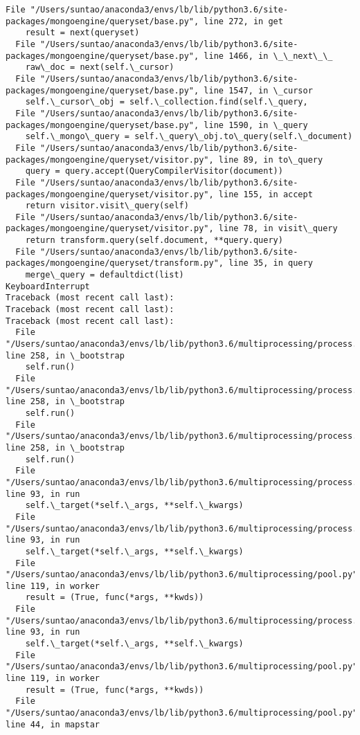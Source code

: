\documentclass[11pt]{article}
\begin{document}
\begin{Verbatim}[commandchars=\\\{\}]
  File "/Users/suntao/anaconda3/envs/lb/lib/python3.6/site-packages/mongoengine/queryset/base.py", line 272, in get
    result = next(queryset)
  File "/Users/suntao/anaconda3/envs/lb/lib/python3.6/site-packages/mongoengine/queryset/base.py", line 1466, in \_\_next\_\_
    raw\_doc = next(self.\_cursor)
  File "/Users/suntao/anaconda3/envs/lb/lib/python3.6/site-packages/mongoengine/queryset/base.py", line 1547, in \_cursor
    self.\_cursor\_obj = self.\_collection.find(self.\_query,
  File "/Users/suntao/anaconda3/envs/lb/lib/python3.6/site-packages/mongoengine/queryset/base.py", line 1590, in \_query
    self.\_mongo\_query = self.\_query\_obj.to\_query(self.\_document)
  File "/Users/suntao/anaconda3/envs/lb/lib/python3.6/site-packages/mongoengine/queryset/visitor.py", line 89, in to\_query
    query = query.accept(QueryCompilerVisitor(document))
  File "/Users/suntao/anaconda3/envs/lb/lib/python3.6/site-packages/mongoengine/queryset/visitor.py", line 155, in accept
    return visitor.visit\_query(self)
  File "/Users/suntao/anaconda3/envs/lb/lib/python3.6/site-packages/mongoengine/queryset/visitor.py", line 78, in visit\_query
    return transform.query(self.document, **query.query)
  File "/Users/suntao/anaconda3/envs/lb/lib/python3.6/site-packages/mongoengine/queryset/transform.py", line 35, in query
    merge\_query = defaultdict(list)
KeyboardInterrupt
Traceback (most recent call last):
Traceback (most recent call last):
Traceback (most recent call last):
  File "/Users/suntao/anaconda3/envs/lb/lib/python3.6/multiprocessing/process.py", line 258, in \_bootstrap
    self.run()
  File "/Users/suntao/anaconda3/envs/lb/lib/python3.6/multiprocessing/process.py", line 258, in \_bootstrap
    self.run()
  File "/Users/suntao/anaconda3/envs/lb/lib/python3.6/multiprocessing/process.py", line 258, in \_bootstrap
    self.run()
  File "/Users/suntao/anaconda3/envs/lb/lib/python3.6/multiprocessing/process.py", line 93, in run
    self.\_target(*self.\_args, **self.\_kwargs)
  File "/Users/suntao/anaconda3/envs/lb/lib/python3.6/multiprocessing/process.py", line 93, in run
    self.\_target(*self.\_args, **self.\_kwargs)
  File "/Users/suntao/anaconda3/envs/lb/lib/python3.6/multiprocessing/pool.py", line 119, in worker
    result = (True, func(*args, **kwds))
  File "/Users/suntao/anaconda3/envs/lb/lib/python3.6/multiprocessing/process.py", line 93, in run
    self.\_target(*self.\_args, **self.\_kwargs)
  File "/Users/suntao/anaconda3/envs/lb/lib/python3.6/multiprocessing/pool.py", line 119, in worker
    result = (True, func(*args, **kwds))
  File "/Users/suntao/anaconda3/envs/lb/lib/python3.6/multiprocessing/pool.py", line 44, in mapstar

\end{Verbatim}
\end{document}
